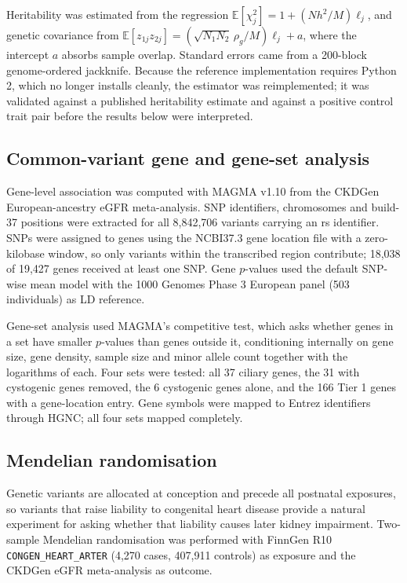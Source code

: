 \documentclass[11pt,a4paper]{article}
\begin{document}
Heritability was estimated from the regression
$\mathbb{E}[\chi^2_j] = 1 + (Nh^2/M)\ell_j$, and genetic covariance from
$\mathbb{E}[z_{1j}z_{2j}] = (\sqrt{N_1N_2}\,\rho_g/M)\ell_j + a$, where the intercept $a$
absorbs sample overlap. Standard errors came from a 200-block genome-ordered jackknife.
Because the reference implementation requires Python 2, which no longer installs cleanly, the
estimator was reimplemented; it was validated against a published heritability estimate and
against a positive control trait pair before the results below were interpreted.

\subsection{Common-variant gene and gene-set analysis}

Gene-level association was computed with MAGMA v1.10 \cite{deleeuw2015} from the CKDGen
European-ancestry eGFR meta-analysis. SNP identifiers, chromosomes and build-37 positions
were extracted for all 8,842,706 variants carrying an rs identifier. SNPs were assigned to
genes using the NCBI37.3 gene location file with a zero-kilobase window, so only variants
within the transcribed region contribute; 18,038 of 19,427 genes received at least one SNP.
Gene $p$-values used the default SNP-wise mean model with the 1000 Genomes Phase 3 European
panel (503 individuals) as LD reference.

Gene-set analysis used MAGMA's competitive test, which asks whether genes in a set have
smaller $p$-values than genes outside it, conditioning internally on gene size, gene
density, sample size and minor allele count together with the logarithms of each. Four sets
were tested: all 37 ciliary genes, the 31 with cystogenic genes removed, the 6 cystogenic
genes alone, and the 166 Tier 1 genes with a gene-location entry. Gene symbols were mapped
to Entrez identifiers through HGNC; all four sets mapped completely.


\subsection{Mendelian randomisation}
\label{sec:mrmethods}

Genetic variants are allocated at conception and precede all postnatal exposures, so
variants that raise liability to congenital heart disease provide a natural experiment for
asking whether that liability causes later kidney impairment. Two-sample Mendelian
randomisation was performed with FinnGen R10 \texttt{CONGEN\_HEART\_ARTER} (4,270 cases,
407,911 controls) as exposure and the CKDGen eGFR meta-analysis as outcome.
\end{document}
